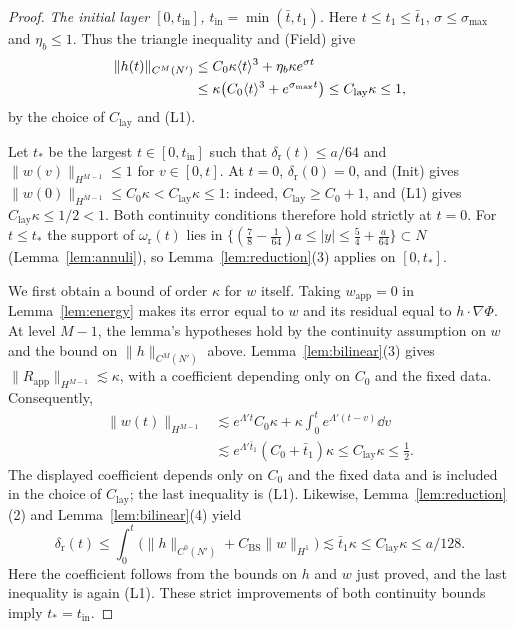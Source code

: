 \begin{proof}
\emph{The initial layer $[0,t_{\mathrm{in}}]$, $t_{\mathrm{in}}=\min(\bar t,t_1)$.}
Here $t\le t_1\le\bar t_1$, $\sigma\le\sigma_{\max}$ and $\eta_b\le1$.
Thus the triangle inequality and (Field) give
\[
\begin{aligned}
\|h(t)\|_{C^M(N')}
&\le C_0\kappa\langle t\rangle^3+\eta_b\kappa e^{\sigma t}\\
&\le\kappa\big(C_0\langle t\rangle^3+e^{\sigma_{\max}t}\big)
\le C_{\mathrm{lay}}\kappa\le1,
\end{aligned}
\]
by the choice of $C_{\mathrm{lay}}$ and (L1).

Let $t_*$ be the largest $t\in[0,t_{\mathrm{in}}]$ such that
$\delta_{\mathrm r}(t)\le a/64$ and $\|w(v)\|_{H^{M-1}}\le1$ for $v\in[0,t]$.
At $t=0$, $\delta_{\mathrm r}(0)=0$, and (Init) gives
$\|w(0)\|_{H^{M-1}}\le C_0\kappa<C_{\mathrm{lay}}\kappa\le1$:
indeed, $C_{\mathrm{lay}}\ge C_0+1$, and (L1) gives $C_{\mathrm{lay}}\kappa\le1/2<1$. Both continuity conditions therefore hold
strictly at $t=0$.
For $t\le t_*$ the support of $\omega_{\mathrm r}(t)$ lies in
$\{(\frac78-\frac1{64})a\le|y|\le\frac54+\frac a{64}\}\subset N$
(Lemma~\ref{lem:annuli}), so Lemma~\ref{lem:reduction}\textup{(3)} applies on $[0,t_*]$.

We first obtain a bound of order $\kappa$ for $w$ itself. Taking
$w_{\mathrm{app}}=0$ in Lemma~\ref{lem:energy} makes its error equal to $w$
and its residual equal to $h\cdot\nabla\Phi$. At level $M-1$, the lemma's
hypotheses hold by the continuity assumption on $w$ and the bound on
$\|h\|_{C^M(N')}$ above. Lemma~\ref{lem:bilinear}\textup{(3)} gives
$\|R_{\mathrm{app}}\|_{H^{M-1}}\lesssim\kappa$, with a coefficient depending only on $C_0$ and the fixed data.
Consequently,
\[
\begin{aligned}
\|w(t)\|_{H^{M-1}}
&\lesssim e^{\Lambda't}C_0\kappa
 +\kappa\int_0^te^{\Lambda'(t-v)}\dd v\\
&\lesssim e^{\Lambda'\bar t_1}(C_0+\bar t_1)\kappa
 \le C_{\mathrm{lay}}\kappa\le\tfrac12.
\end{aligned}
\]
The displayed coefficient depends only on $C_0$ and the fixed data and is
included in the choice of $C_{\mathrm{lay}}$; the last inequality is (L1).
Likewise, Lemma~\ref{lem:reduction}\textup{(2)} and
Lemma~\ref{lem:bilinear}\textup{(4)} yield
\[
\delta_{\mathrm r}(t)
\le\int_0^t\big(\|h\|_{C^0(N')}+C_{\mathrm{BS}}\|w\|_{H^1}\big)
\lesssim\bar t_1\kappa\le C_{\mathrm{lay}}\kappa\le a/128.
\]
Here the coefficient follows from the bounds on $h$ and $w$ just proved,
and the last inequality is again (L1).
These strict improvements of both continuity bounds imply $t_*=t_{\mathrm{in}}$.


\end{proof}
